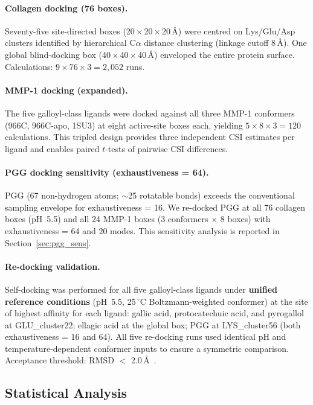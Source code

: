 \documentclass[11pt]{article}
\begin{document}
\paragraph{Collagen docking (76 boxes).}
Seventy-five site-directed boxes (20\,$\times$\,20\,$\times$\,20\,\AA)
were centred on Lys/Glu/Asp clusters identified by hierarchical
C$\alpha$ distance clustering (linkage cutoff 8\,\AA).
One global blind-docking box (40\,$\times$\,40\,$\times$\,40\,\AA)
enveloped the entire protein surface.
Calculations: $9 \times 76 \times 3 = 2{,}052$ runs.

\paragraph{MMP-1 docking (expanded).}
The five galloyl-class ligands were docked against all three MMP-1 conformers
(966C, 966C-apo, 1SU3) at eight active-site boxes each, yielding
$5 \times 8 \times 3 = 120$ calculations.  This tripled design provides
three independent CSI estimates per ligand and enables paired $t$-tests
of pairwise CSI differences.

\paragraph{PGG docking sensitivity (exhaustiveness = 64).}
PGG (67 non-hydrogen atoms; $\sim$25 rotatable bonds) exceeds the
conventional sampling envelope for exhaustiveness = 16.
We re-docked PGG at all 76 collagen boxes (pH~5.5) and all 24 MMP-1 boxes
(3 conformers $\times$ 8 boxes) with exhaustiveness = 64 and 20 modes.
This sensitivity analysis is reported in Section~\ref{sec:pgg_sens}.

\paragraph{Re-docking validation.}
Self-docking was performed for all five galloyl-class ligands under
\textbf{unified reference conditions} (pH~5.5, 25\,$^{\circ}$C
Boltzmann-weighted conformer) at the site of highest affinity for each
ligand: gallic acid, protocatechuic acid, and pyrogallol at GLU\_cluster22;
ellagic acid at the global box; PGG at LYS\_cluster56 (both
exhaustiveness = 16 and 64).  All five re-docking runs used identical pH and
temperature-dependent conformer inputs to ensure a symmetric comparison.
Acceptance threshold: RMSD $<$ 2.0\,\AA\ \cite{warren2006critical}.

\subsection{Statistical Analysis}
\label{sec:stats}
\end{document}
